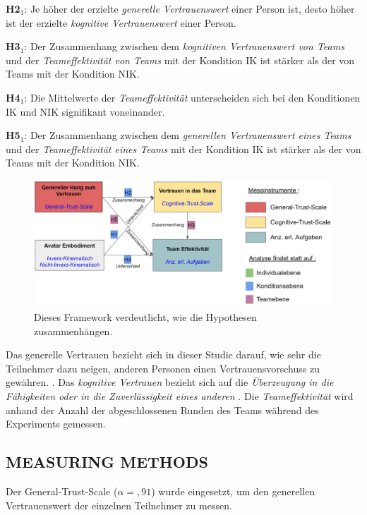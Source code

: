 \documentclass[sigchi]{acmart}
\begin{document}
\textbf{H2$_{1}$}: Je höher der erzielte \textit{generelle Vertrauenswert} einer Person ist, desto höher ist der erzielte \textit{kognitive Vertrauenswert} einer Person.

\textbf{H3$_{1}$}: Der Zusammenhang zwischen dem \textit{kognitiven Vertrauenswert von Teams} und der \textit{Teameffektivität von Teams} mit der Kondition IK ist stärker als der von Teams mit der Kondition NIK.

\textbf{H4$_{1}$}: Die Mittelwerte der \textit{Teameffektivität} unterscheiden sich bei den Konditionen IK und NIK signifikant voneinander.

\textbf{H5$_{1}$}: Der Zusammenhang zwischen dem \textit{generellen Vertrauenswert eines Teams} und der \textit{Teameffektivität eines Teams} mit der Kondition IK ist stärker als der von Teams mit der Kondition NIK.

\begin{figure}[H]
		\begin{footnotesize}
			\includegraphics[width=\linewidth]{Abbildungen/Versuchshypothesen_02.JPG}		
			\caption[Das Framework der Versuchshypothesen]{Dieses Framework verdeutlicht, wie die Hypothesen zusammenhängen.}
			\label{Versuchshypothesen}
		\end{footnotesize}
	\end{figure}	

Das generelle Vertrauen bezieht sich in dieser Studie darauf, wie sehr die Teilnehmer dazu neigen, anderen Personen einen Vertrauensvorschuss zu gewähren. \citep[S. 30]{mcallister1995affect}.
Das \textit{kognitive Vertrauen} bezieht sich auf die \textit{Überzeugung in die Fähigkeiten oder in die Zuverlässigkeit eines anderen} \citep[S. 30]{mcallister1995affect}.
Die \textit{Teameffektivität} wird anhand der Anzahl der abgeschlossenen Runden des Teams während des Experiments gemessen.

\subsection{MEASURING METHODS}
Der General-Trust-Scale ($\alpha =,91$) \citep{couch1996assessment} wurde eingesetzt, um den generellen Vertrauenswert der einzelnen Teilnehmer zu messen. 
\end{document}
